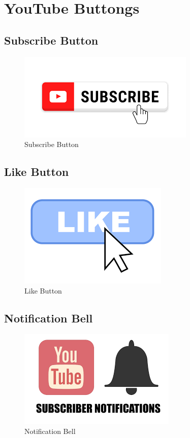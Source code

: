 \chapter{YouTube Buttongs}


\section{Subscribe Button}
\begin{figure}[ht]
    \centering
    \includegraphics{images/subscribe-ytb.png}
    \caption{Subscribe Button}
    \label{fig:Subscribe}
\end{figure}

\section{Like Button}
\begin{figure}[ht]
    \centering
    \includegraphics{images/like-ytb.png}
    \caption{Like Button}
    \label{fig:Like}
\end{figure}

\section{Notification Bell}
\begin{figure}[ht]
    \centering
    \includegraphics{images/notify-ytb.png}
    \caption{Notification Bell}
    \label{fig:Notification}
\end{figure}